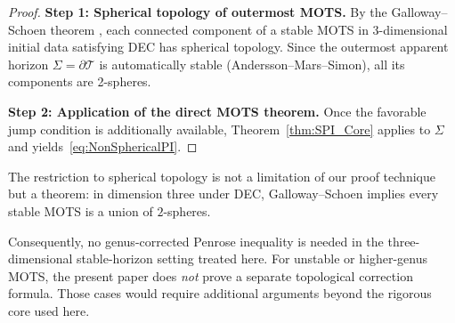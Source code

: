 \begin{proof}
\textbf{Step 1: Spherical topology of outermost MOTS.}
By the Galloway--Schoen theorem \cite{gallowayschoen2006}, each connected component of a stable MOTS in 3-dimensional initial data satisfying DEC has spherical topology. Since the outermost apparent horizon $\Sigma = \partial\mathcal{T}$ is automatically stable (Andersson--Mars--Simon), all its components are 2-spheres.

\textbf{Step 2: Application of the direct MOTS theorem.}
Once the favorable jump condition is additionally available, Theorem~\ref{thm:SPI_Core} applies to $\Sigma$ and yields~\eqref{eq:NonSphericalPI}.
\end{proof}

\begin{remark}
The restriction to spherical topology is not a limitation of our proof technique but a theorem: in dimension three under DEC, Galloway--Schoen \cite{gallowayschoen2006} implies every stable MOTS is a union of $2$-spheres.

Consequently, no genus-corrected Penrose inequality is needed in the three-dimensional stable-horizon setting treated here. For unstable or higher-genus MOTS, the present paper does \emph{not} prove a separate topological correction formula. Those cases would require additional arguments beyond the rigorous core used here.
\end{remark}

